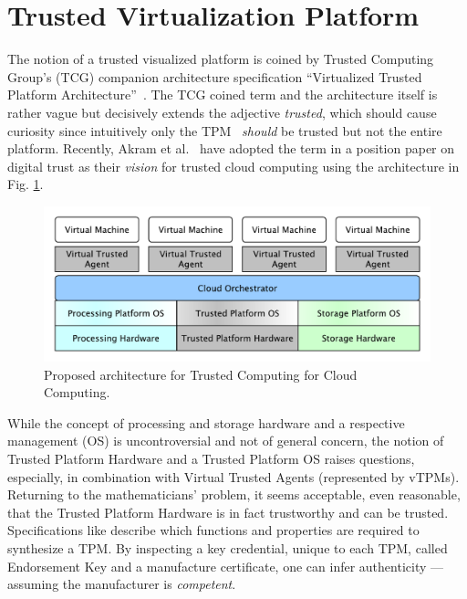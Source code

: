 \section{Trusted Virtualization Platform}
The notion of a trusted visualized platform is coined by Trusted Computing Group's (TCG) companion architecture specification ``Virtualized Trusted Platform Architecture''~\cite{VTPA}. The TCG coined term and the architecture itself is rather vague but decisively extends the adjective \emph{trusted}, which should cause curiosity since intuitively only the TPM~\cite{ISOTPM} \emph{should} be trusted but not the entire platform. Recently, Akram et al.~\cite{digitaltrust} have adopted the term in a position paper on digital trust as their \emph{vision} for trusted cloud computing using the architecture in Fig. \ref{fig:vplatform}.
\begin{figure}[!ht]
  \centering
  \includegraphics[scale=0.35]{figures/vplatform}
  \caption{Proposed architecture for Trusted Computing for Cloud Computing.~\cite{digitaltrust}}
  \label{fig:vplatform}
\end{figure}

While the concept of processing and storage hardware and a respective management (OS) is uncontroversial and not of general concern, the notion of Trusted Platform Hardware and a Trusted Platform OS raises questions, especially, in combination with Virtual Trusted Agents (represented by vTPMs).
Returning to the mathematicians' problem, it seems acceptable, even reasonable, that the Trusted Platform Hardware is in fact trustworthy and can be trusted. Specifications like \cite{ISOTPM} describe which functions and properties are required to synthesize a TPM. By inspecting a key credential, unique to each TPM, called Endorsement Key and a manufacture certificate, one can infer authenticity --- assuming the manufacturer is \emph{competent}.

